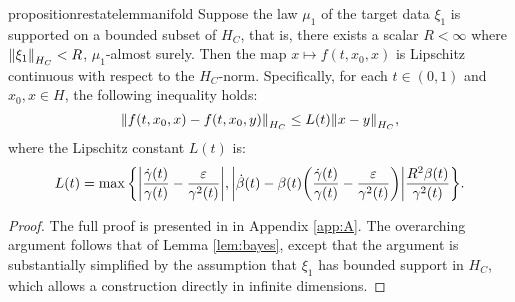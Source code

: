 \begin{theorembox}
  \begin{restatable}{proposition}{restatelemmanifold}\label{lem:manifold}
    Suppose the law \(\mu_{1}\) of the target data \(\xi_{1}\) is supported on a bounded subset of \(H_{C}\), that is, there exists a scalar \(R < \infty\) where \(\norm{\xi_{1}}_{H_{C}} < R\), \(\mu_{1}\)-almost surely. Then the map \(x \mapsto f(t, x_{0}, x)\) is Lipschitz continuous with respect to the \(H_{C}\)-norm. Specifically, for each \(t \in (0, 1)\) and \(x_{0}, x \in H\), the following inequality holds:
    \[
      \norm{f(t, x_{0}, x) - f(t, x_{0}, y)}_{H_{C}} \leq L(t) \norm{x - y}_{H_{C}},
    \]
    where the Lipschitz constant \(L(t)\) is:
    \[
      L(t) =  \mathop{\underset{}{\max}}\qty{\abs{\frac{\dot{\gamma}(t)}{\gamma(t)} - \frac{\varepsilon}{\gamma^{2}(t)}}, \abs{\dot{\beta}(t) - \beta(t)\qty(\frac{\dot{\gamma}(t)}{\gamma(t)} - \frac{\varepsilon}{\gamma^{2}(t)})} \frac{R^{2} \beta(t)}{\gamma^{2}(t)}}.
    \]
  \end{restatable}
\end{theorembox}
\begin{proof}
  The full proof is presented in  in Appendix \ref{app:A}. The overarching argument follows that of Lemma \ref{lem:bayes}, except that the argument is substantially simplified by the assumption that \(\xi_{1}\) has bounded support in \(H_{C}\), which allows a construction directly in infinite dimensions.
\end{proof}
